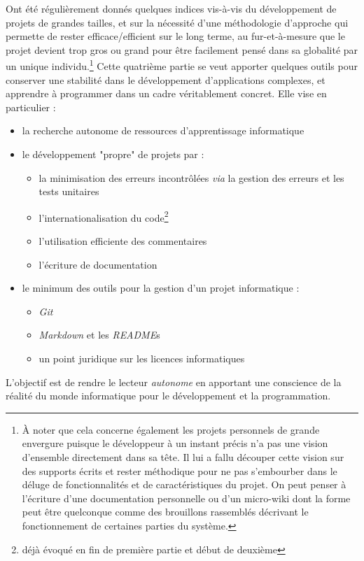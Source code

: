 \documentclass[../../main.tex]{subfiles}
\begin{document}
Ont été régulièrement donnés quelques indices vis-à-vis du développement de projets de grandes tailles, et sur la nécessité d'une méthodologie d'approche qui permette de rester efficace/efficient sur le long terme, au fur-et-à-mesure que le projet devient trop gros ou grand pour être facilement pensé dans sa globalité par un unique individu.\footnote{À noter que cela concerne également les projets personnels de grande envergure puisque le développeur à un instant précis n'a pas une vision d'ensemble directement dans sa tête. Il lui a fallu découper cette vision sur des supports écrits et rester méthodique pour ne pas s'embourber dans le déluge de fonctionnalités et de caractéristiques du projet. On peut penser à l'écriture d'une documentation personnelle ou d'un micro-wiki dont la forme peut être quelconque comme des brouillons rassemblés décrivant le fonctionnement de certaines parties du système.} Cette quatrième partie se veut apporter quelques outils pour conserver une stabilité dans le développement d'applications complexes, et apprendre à programmer dans un cadre véritablement concret. Elle vise en particulier :
\begin{itemize}
	\item la recherche autonome de ressources d'apprentissage informatique
	\item le développement "propre" de projets par :
	\begin{itemize}
		\item la minimisation des erreurs incontrôlées \textit{via} la gestion des erreurs et les tests unitaires
		\item l'internationalisation du code\footnote{déjà évoqué en fin de première partie et début de deuxième}
		\item l'utilisation efficiente des commentaires
		\item l'écriture de documentation
	\end{itemize}
	\item le minimum des outils pour la gestion d'un projet informatique :
		\begin{itemize}
			\item \textit{Git}
			\item \textit{Markdown} et les \textit{README}s
			\item un point juridique sur les licences informatiques
		\end{itemize}
\end{itemize}
L'objectif est de rendre le lecteur \textit{autonome} en apportant une conscience de la réalité du monde informatique pour le développement et la programmation.

\hrulefill
\newpage
\end{document}
